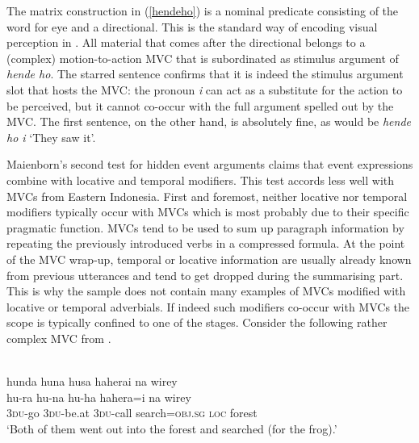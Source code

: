 The matrix construction in (\ref{hendeho}) is a nominal predicate consisting of the word for eye and a directional. This is the standard way of encoding visual perception in . All material that comes after the directional belongs to a (complex) motion-to-action MVC that is subordinated as stimulus argument of \textit{hende ho}. The starred sentence confirms that it is indeed the stimulus argument slot that hosts the MVC: the pronoun \textit{i} can act as a substitute for the action to be perceived, but it cannot co-occur with the full argument spelled out by the MVC. The first sentence, on the other hand, is absolutely fine, as would be \textit{hende ho i} `They saw it'.

Maienborn's second test for hidden event arguments claims that event expressions combine with locative and temporal modifiers. This test accords less well with MVCs from Eastern Indonesia. First and foremost, neither locative nor temporal modifiers typically occur with MVCs which is most probably due to their specific pragmatic function. MVCs tend to be used to sum up paragraph information by repeating the previously introduced verbs in a compressed formula. At the point of the MVC wrap-up, temporal or locative information are usually already known from previous utterances and tend to get dropped during the summarising part. This is why the sample does not contain many examples of MVCs modified with locative or temporal adverbials. If indeed such modifiers co-occur with MVCs the scope is typically confined to one of the stages. Consider the following rather complex MVC from .

\ea  
{}\\
\glll hunda huna husa haherai na wirey \\
hu-ra hu-na hu-ha hahera=i na wirey \\
3\textsc{du}-go 3\textsc{du}-be.at 3\textsc{du}-call search=\textsc{obj}.\textsc{sg} \textsc{loc} forest\\
\glft `Both of them went out into the forest and searched (for the frog).' \\
\z

